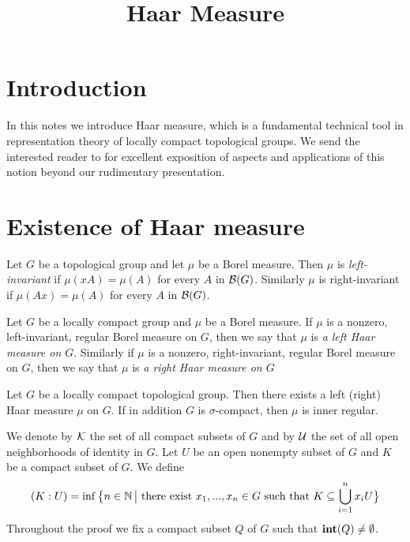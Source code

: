 



\title{Haar Measure}
\date{}
\maketitle

\section{Introduction}
\noindent
In this notes we introduce Haar measure, which is a fundamental technical tool in representation theory of locally compact topological groups. We send the interested reader to \cite{diestel2014joys} for excellent exposition of aspects and applications of this notion beyond our rudimentary presentation.

\section{Existence of Haar measure}

\begin{definition}
Let $G$ be a topological group and let $\mu$ be a Borel measure. Then $\mu$ is \textit{left-invariant} if $\mu(xA) = \mu(A)$ for every $A$ in ${\mathcal B}(G)$. Similarly $\mu$ is right-invariant if $\mu(Ax) = \mu(A)$ for every $A$ in ${\mathcal B}(G)$.
\end{definition}

\begin{definition}
Let $G$ be a locally compact group and $\mu$ be a Borel measure. If $\mu$ is a nonzero, left-invariant, regular Borel measure on $G$, then we say that $\mu$ is \textit{a left Haar measure on $G$}. Similarly if $\mu$ is a nonzero, right-invariant, regular Borel measure on $G$, then we say that $\mu$ is \textit{a right Haar measure on $G$} 
\end{definition}

\begin{theorem}
Let $G$ be a locally compact topological group. Then there exists a left (right) Haar measure $\mu$ on $G$. If in addition $G$ is $\sigma$-compact, then $\mu$ is inner regular.
\end{theorem}
\noindent
We denote by ${\mathcal K}$ the set of all compact subsets of $G$ and by ${\mathcal U}$ the set of all open neighborhoods of identity in $G$. Let $U$ be an open nonempty subset of $G$ and $K$ be a compact subset of $G$. We define
$$(K:U) = \inf \big\{n\in {\mathbb N}\,\big|\mbox{ there exist }x_1,...,x_n\in G\mbox{ such that }K\subseteq \bigcup_{i=1}^nx_iU\big\}$$
Throughout the proof we fix a compact subset $Q$ of $G$ such that $\mathbf{int}(Q) \neq \emptyset$.

